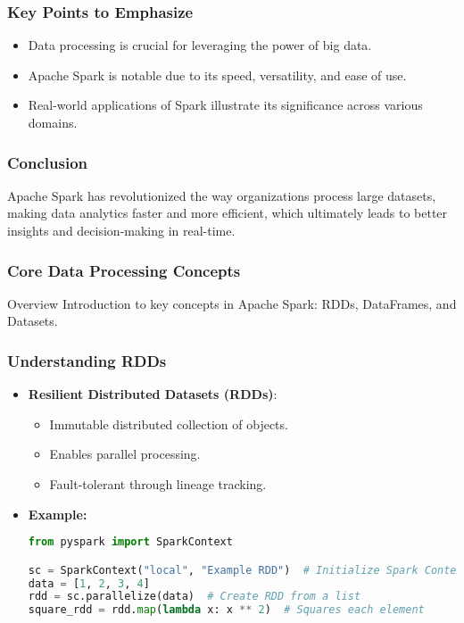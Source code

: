 \documentclass[aspectratio=169]{beamer}
\begin{document}
\begin{frame}[fragile]
    \frametitle{Key Points to Emphasize}
    \begin{itemize}
        \item Data processing is crucial for leveraging the power of big data.
        \item Apache Spark is notable due to its speed, versatility, and ease of use.
        \item Real-world applications of Spark illustrate its significance across various domains.
    \end{itemize}
\end{frame}

\begin{frame}[fragile]
    \frametitle{Conclusion}
    Apache Spark has revolutionized the way organizations process large datasets, making data analytics faster and more efficient, which ultimately leads to better insights and decision-making in real-time.
\end{frame}

\begin{frame}[fragile]
    \frametitle{Core Data Processing Concepts}
    \begin{block}{Overview}
        Introduction to key concepts in Apache Spark: RDDs, DataFrames, and Datasets.
    \end{block}
\end{frame}

\begin{frame}[fragile]
    \frametitle{Understanding RDDs}
    \begin{itemize}
        \item \textbf{Resilient Distributed Datasets (RDDs)}: 
        \begin{itemize}
            \item Immutable distributed collection of objects.
            \item Enables parallel processing.
            \item Fault-tolerant through lineage tracking.
        \end{itemize}
        \item \textbf{Example:}
        \begin{lstlisting}[language=Python]
from pyspark import SparkContext

sc = SparkContext("local", "Example RDD")  # Initialize Spark Context
data = [1, 2, 3, 4]
rdd = sc.parallelize(data)  # Create RDD from a list
square_rdd = rdd.map(lambda x: x ** 2)  # Squares each element
        \end{lstlisting}
    \end{itemize}
\end{frame}
\end{document}
